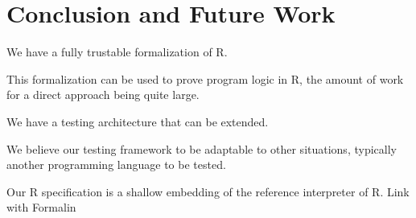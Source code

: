 \documentclass[
    sigplan,
    10pt,
    review, %
    natbib=false %
 ]{acmart}
\begin{document}
\section{Conclusion and Future Work}
\label{sec:conclusion}

\todo{}

We have a fully trustable formalization of R.

This formalization can be used to prove program logic in R,
the amount of work for a direct approach being quite large.

We have a testing architecture that can be extended.

We believe our testing framework to be adaptable to other situations,
typically another programming language to be tested.

Our R specification is a shallow embedding of the reference interpreter of R.
Link with Formalin

\printbibliography{}
\end{document}
